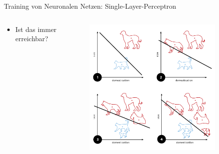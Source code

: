 \documentclass[aspectratio=1610, xcolor=dvipsnames, 9pt]{beamer}
\begin{document}
\begin{frame}{Training von Neuronalen Netzen: Single-Layer-Perceptron}
\begin{columns}
\begin{column}{0.7\textwidth}
\begin{itemize}
              \item Ist das immer erreichbar?
            \end{itemize}
          \end{column}
          \begin{column}{0.3\textwidth}
       \begin{figure}
       \centering
                   \includegraphics[width=0.9\textwidth]{images/Perceptron_example.svg.png}
       \end{figure}
          \end{column}
        \end{columns}
      \end{frame}
\end{document}
